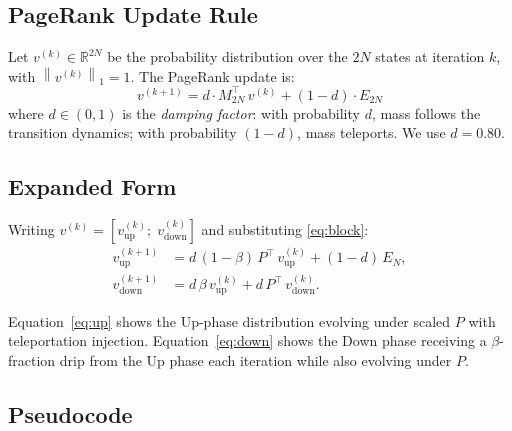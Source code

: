 \documentclass[12pt,a4paper]{article}
\theoremstyle{definition}
\theoremstyle{plain}
\newcommand{\vup}{v_{\mathrm{up}}}
\newcommand{\vdown}{v_{\mathrm{down}}}
\newcommand{\norm}[1]{\left\|#1\right\|}
\begin{document}
\subsection{PageRank Update Rule}

Let $v^{(k)} \in \mathbb{R}^{2N}$ be the probability distribution over the $2N$
states at iteration $k$, with $\norm{v^{(k)}}_1 = 1$. The PageRank update is:
\begin{equation}
  \boxed{v^{(k+1)} = d \cdot M_{2N}^{\top}\, v^{(k)}
    + (1-d)\cdot E_{2N}}
  \label{eq:pagerank}
\end{equation}
where $d \in (0,1)$ is the \emph{damping factor}: with probability $d$, mass follows the
transition dynamics; with probability $(1-d)$, mass teleports. We use $d = 0.80$.

\subsection{Expanded Form}

Writing $v^{(k)} = \left[\vup^{(k)};\;\vdown^{(k)}\right]$ and substituting
\eqref{eq:block}:
\begin{align}
  \vup^{(k+1)} &= d\,(1-\beta)\,P^{\top}\,\vup^{(k)}
    + (1-d)\,E_N, \label{eq:up}\\
  \vdown^{(k+1)} &= d\,\beta\,\vup^{(k)}
    + d\,P^{\top}\,\vdown^{(k)}. \label{eq:down}
\end{align}

Equation~\eqref{eq:up} shows the Up-phase distribution evolving under scaled $P$ with
teleportation injection. Equation~\eqref{eq:down} shows the Down phase receiving a
$\beta$-fraction drip from the Up phase each iteration while also evolving under $P$.

\subsection{Pseudocode}
\end{document}
